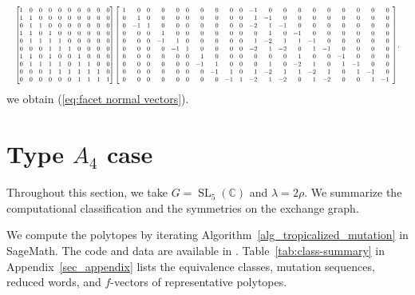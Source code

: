 \documentclass[10pt]{amsart}
\numberwithin{equation}{section}
\DeclareMathOperator{\SL}{SL}
\newcommand{\C}{{\mathbb{C}}}
\theoremstyle{plain}
\theoremstyle{definition}
\theoremstyle{remark}
\begin{document}
\[
\resizebox{\textwidth}{!}{$
\begin{bmatrix}
	1&0&0&0&0&0&0&0&0&0\\
	1&1&0&0&0&0&0&0&0&0\\
	0&1&1&0&0&0&0&0&0&0\\
	1&1&0&1&0&0&0&0&0&0\\
	0&1&1&1&1&0&0&0&0&0\\
	0&0&0&1&1&1&0&0&0&0\\
	1&1&0&1&0&0&1&0&0&0\\
	0&1&1&1&1&0&1&1&0&0\\
	0&0&0&1&1&1&1&1&1&0\\
	0&0&0&0&0&0&1&1&1&1
\end{bmatrix}
	\left[
	\begin{array}{*{20}{r}}
		1 & 0 & 0 & 0 & 0 & 0 & 0 & 0 & 0 & 0 & -1 & 0 & 0 & 0 & 0 & 0 & 0 & 0 & 0 & 0 \\
		0 & 1 & 0 & 0 & 0 & 0 & 0 & 0 & 0 & 0 & 1 & -1 & 0 & 0 & 0 & 0 & 0 & 0 & 0 & 0 \\
		0 & -1 & 1 & 0 & 0 & 0 & 0 & 0 & 0 & 0 & -2 & 1 & -1 & 0 & 0 & 0 & 0 & 0 & 0 & 0 \\
		0 & 0 & 0 & 1 & 0 & 0 & 0 & 0 & 0 & 0 & 0 & 1 & 0 & -1 & 0 & 0 & 0 & 0 & 0 & 0 \\
		0 & 0 & 0 & -1 & 1 & 0 & 0 & 0 & 0 & 0 & 1 & -2 & 1 & 1 & -1 & 0 & 0 & 0 & 0 & 0 \\
		0 & 0 & 0 & 0 & -1 & 1 & 0 & 0 & 0 & 0 & -2 & 1 & -2 & 0 & 1 & -1 & 0 & 0 & 0 & 0 \\
		0 & 0 & 0 & 0 & 0 & 0 & 1 & 0 & 0 & 0 & 0 & 0 & 0 & 1 & 0 & 0 & -1 & 0 & 0 & 0 \\
		0 & 0 & 0 & 0 & 0 & 0 & -1 & 1 & 0 & 0 & 0 & 1 & 0 & -2 & 1 & 0 & 1 & -1 & 0 & 0 \\
		0 & 0 & 0 & 0 & 0 & 0 & 0 & -1 & 1 & 0 & 1 & -2 & 1 & 1 & -2 & 1 & 0 & 1 & -1 & 0 \\
		0 & 0 & 0 & 0 & 0 & 0 & 0 & 0 & -1 & 1 & -2 & 1 & -2 & 0 & 1 & -2 & 0 & 0 & 1 & -1
	\end{array}
	\right],
	$}
\]
we obtain (\ref{eq:facet normal vectors}).


\section{Type $A_4$ case}
\label{sec_combinatorial}
Throughout this section, we take $G=\SL_5(\C)$ and
$\lambda=2\rho$.
We summarize the computational classification and
the symmetries on the exchange graph.

We compute the polytopes by iterating
Algorithm~\ref{alg_tropicalized_mutation} in SageMath.
The code and data are available in \cite{github}.
Table~\ref{tab:class-summary} in Appendix~\ref{sec_appendix}
lists the equivalence classes, mutation sequences, reduced words,
and $f$-vectors of representative polytopes.
\end{document}
